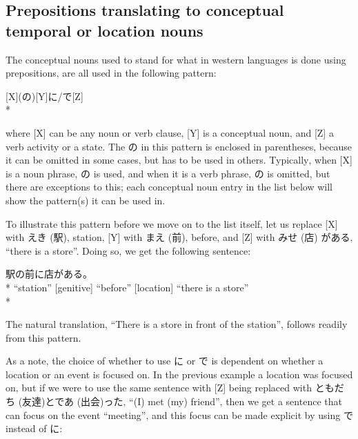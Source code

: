 \documentclass[11pt, b5paper, twoside, openright, onecolumn]{book}
\makeatletter
\newcommand*{\rubystack}[2]{{\relscale{0.5}%
  \begin{tabular}[b]{@{}c@{}}%
    {#1}\\%
   {\textscale{2}{#2}}%
  \end{tabular}}%
}
\DeclareRobustCommand*{\ruby}[2]{%
  \mbox{%
    \setlength{\parskip}{0ex}%
    \BeginAccSupp{method=pdfstringdef,ActualText={#1}}%
      \rubystack{\phantom{#2}}{#1}%
      \llap{%
        \rubystack{#2}{\phantom{#1}}%
      }%
    \EndAccSupp{}%
  }%
}
\renewcommand*{\ruby}[2]{#2 (#1)}%
\newenvironment{exampleblock}{
\setlength{\parindent}{0.6in}
\begin{minipage}[t]{\dimexpr\textwidth-\parindent}}
{\end{minipage}}
\makeatother
\begin{document}
\subsection{Prepositions translating to conceptual temporal or location nouns}


The conceptual nouns used to stand for what in western languages is done using prepositions‚ are all used in the following pattern:

\vspace{0.4cm}
\begin{exampleblock}
[X](の)[Y]に/で[Z] \\* 
\end{exampleblock}
\vspace{0.2cm}

where [X] can be any noun or verb clause‚ [Y] is a conceptual noun‚ and [Z] a verb activity or a state. The の in this pattern is enclosed in parentheses‚ because it can be omitted in some cases‚ but has to be used in others. Typically‚ when [X] is a noun phrase‚ の is used‚ and when it is a verb phrase‚ の is omitted‚ but there are exceptions to this; each conceptual noun entry in the list below will show the pattern(s) it can be used in.

To illustrate this pattern before we move on to the list itself‚ let us replace [X] with \ruby{駅}{えき}‚ station‚ [Y] with \ruby{前}{まえ}‚ before‚ and [Z] with \ruby{店}{みせ} がある‚ “there is a store”. Doing so‚ we get the following sentence:

\vspace{0.4cm}
\begin{exampleblock}
駅の前に店がある。 \\* 
“station” [genitive] “before” [location] “there is a store” \\* 
\end{exampleblock}
\vspace{0.2cm}

The natural translation‚ “There is a store in front of the station”‚ follows readily from this pattern.

As a note‚ the choice of whether to use に or で is dependent on whether a location or an event is focused on. In the previous example a location was focused on‚ but if we were to use the same sentence with [Z] being replaced with \ruby{友達}{ともだち}と\ruby{出会}{であ}った‚ “(I) met (my) friend”‚ then we get a sentence that can focus on the event “meeting”‚ and this focus can be made explicit by using で instead of に:
\end{document}
